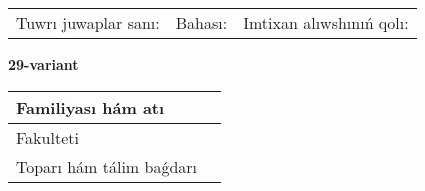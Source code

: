 \documentclass{article}
\begin{document}
\vspace{1cm}

\begin{tabular}{lll}
Tuwrı juwaplar sanı: \underline{\hspace{1.5cm}} & 
Bahası: \underline{\hspace{1.5cm}} & 
Imtixan alıwshınıń qolı: \underline{\hspace{2cm}} \\
\end{tabular}

\egroup

\newpage


\textbf{29-variant}\\

\bgroup
\def\arraystretch{1.6} %

\begin{tabular}{|m{5.7cm}|m{9.5cm}|}
\hline
Familiyası hám atı & \\
\hline
Fakulteti  & \\
\hline
Toparı hám tálim baǵdarı  & \\
\hline
\end{tabular}

\vspace{1cm}
\end{document}
